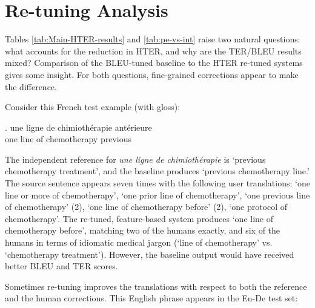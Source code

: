 \section{\label{sec:Analysis}Re-tuning Analysis}

Tables \ref{tab:Main-HTER-results} and \ref{tab:pe-vs-int} raise
two natural questions: what accounts for the reduction in HTER, and
why are the TER/BLEU results mixed? Comparison of the BLEU-tuned baseline
to the HTER re-tuned systems gives some insight. For both questions,
fine-grained corrections appear to make the difference.

Consider this French test example (with gloss):

\vspace{-0.25em}
\exg. une ligne de chimioth\'{e}rapie ant\'{e}rieure\\
      one line of chemotherapy previous\\%
\vspace{-0.25em}

\noindent The independent reference for \textit{une ligne de chimioth\'{e}rapie} is `previous chemotherapy treatment', and the baseline produces `previous chemotherapy line.' The source sentence appears seven times with the following user translations: `one line or more of chemotherapy', `one prior line of chemotherapy',
`one previous line of chemotherapy' (2), `one line of chemotherapy before' (2), `one protocol of chemotherapy'. The re-tuned, feature-based system produces `one line of chemotherapy before', matching two of the humans exactly, and six of the humans in terms of idiomatic medical jargon (`line of chemotherapy' vs. `chemotherapy treatment'). However, the baseline output would have received better BLEU and TER scores.




Sometimes re-tuning improves the translations with respect to both
the reference and the human corrections. This English phrase appears in the En-De test set:

